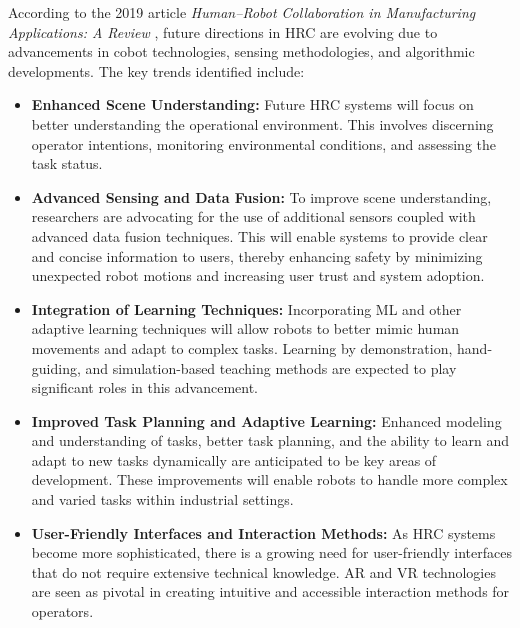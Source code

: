 According to the 2019 article \textit{Human–Robot Collaboration in Manufacturing Applications: A Review} \cite{robotics8040100}, future directions in 
\ac{HRC} are evolving due to advancements in cobot technologies, sensing methodologies, and algorithmic developments. The key trends identified include:

\begin{itemize}
    \item \textbf{Enhanced Scene Understanding:} Future \ac{HRC} systems will focus on better understanding the operational environment. 
    This involves discerning operator intentions, monitoring environmental conditions, and assessing the task status. 

    \item \textbf{Advanced Sensing and Data Fusion:} To improve scene understanding, researchers are advocating for the use of additional sensors 
    coupled with advanced data fusion techniques. This will enable systems to provide clear and concise information to users, thereby enhancing 
    safety by minimizing unexpected robot motions and increasing user trust and system adoption.
    
    \item \textbf{Integration of Learning Techniques:} Incorporating \ac{ML} and other adaptive learning techniques will allow 
    robots to better mimic human movements and adapt to complex tasks. Learning by demonstration, hand-guiding, and simulation-based teaching methods 
    are expected to play significant roles in this advancement.
    
    \item \textbf{Improved Task Planning and Adaptive Learning:} Enhanced modeling and understanding of tasks, better task planning, and the ability 
    to learn and adapt to new tasks dynamically are anticipated to be key areas of development. These improvements will enable robots to handle more 
    complex and varied tasks within industrial settings.
    
    \item \textbf{User-Friendly Interfaces and Interaction Methods:} As \ac{HRC} systems become more sophisticated, there is a growing need for user-friendly 
    interfaces that do not require extensive technical knowledge. \ac{AR} and \ac{VR} technologies are seen as pivotal in creating intuitive and 
    accessible interaction methods for operators.
\end{itemize}


